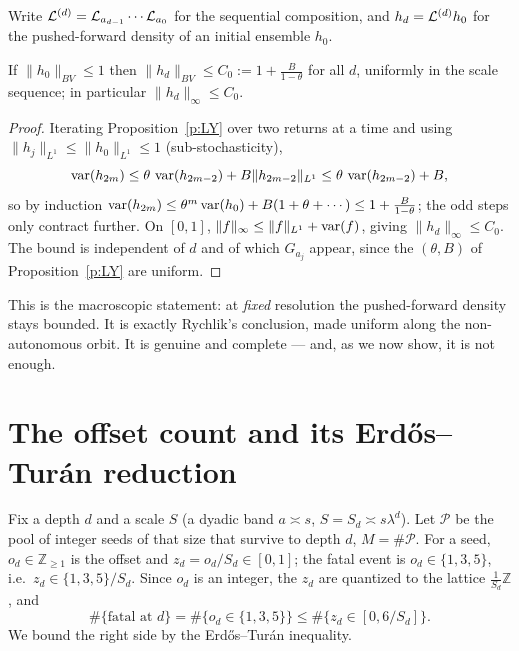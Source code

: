 \documentclass[11pt]{article}
\theoremstyle{remark}\newtheorem{remark}{Remark}
\newcommand{\Z}{\mathbb{Z}}\newcommand{\R}{\mathbf{R}}\newcommand{\D}{\mathcal D}
\begin{document}
Write $\mathcal L^{(d)}=\mathcal L_{a_{d-1}}\cdots\mathcal L_{a_0}$ for the sequential
composition, and $h_d=\mathcal L^{(d)}h_0$ for the pushed-forward density of an
initial ensemble $h_0$.

\begin{lemma}\label{l:seq}
If $\|h_0\|_{BV}\le1$ then $\|h_d\|_{BV}\le C_0:=1+\tfrac{B}{1-\theta}$ for all
$d$, uniformly in the scale sequence; in particular $\|h_d\|_\infty\le C_0$.
\end{lemma}
\begin{proof}
Iterating Proposition~\ref{p:LY} over two returns at a time and using
$\|h_j\|_{L^1}\le\|h_0\|_{L^1}\le1$ (sub-stochasticity),
\[
\operatorname{var}(h_{2m})\le\theta\,\operatorname{var}(h_{2m-2})+B\|h_{2m-2}\|_{L^1}\le\theta\,\operatorname{var}(h_{2m-2})+B,
\]
so by induction $\operatorname{var}(h_{2m})\le\theta^m\operatorname{var}(h_0)+B(1+\theta+\cdots)\le
1+\tfrac{B}{1-\theta}$; the odd steps only contract further. On $[0,1]$,
$\|f\|_\infty\le\|f\|_{L^1}+\operatorname{var}(f)$, giving $\|h_d\|_\infty\le C_0$. The bound
is independent of $d$ and of which $G_{a_j}$ appear, since the $(\theta,B)$ of
Proposition~\ref{p:LY} are uniform.
\end{proof}

This is the macroscopic statement: at \emph{fixed} resolution the pushed-forward
density stays bounded. It is exactly Rychlik's conclusion, made uniform along
the non-autonomous orbit. It is genuine and complete --- and, as we now show,
it is not enough.

\section{The offset count and its Erd\H os--Tur\'an reduction}
Fix a depth $d$ and a scale $S$ (a dyadic band $a\asymp s$, $S=S_d\asymp
s\lambda^d$). Let $\mathcal P$ be the pool of integer seeds of that size that
survive to depth $d$, $M=\#\mathcal P$. For a seed, $o_d\in\Z_{\ge1}$ is the
offset and $z_d=o_d/S_d\in[0,1]$; the fatal event is $o_d\in\{1,3,5\}$, i.e.\
$z_d\in\{1,3,5\}/S_d$. Since $o_d$ is an integer, the $z_d$ are quantized to the
lattice $\tfrac1{S_d}\Z$, and
\begin{equation}\label{eq:count}
\#\{\text{fatal at }d\}=\#\{o_d\in\{1,3,5\}\}\le\#\{z_d\in[0,6/S_d]\}.
\end{equation}
We bound the right side by the Erd\H os--Tur\'an inequality.
\end{document}
